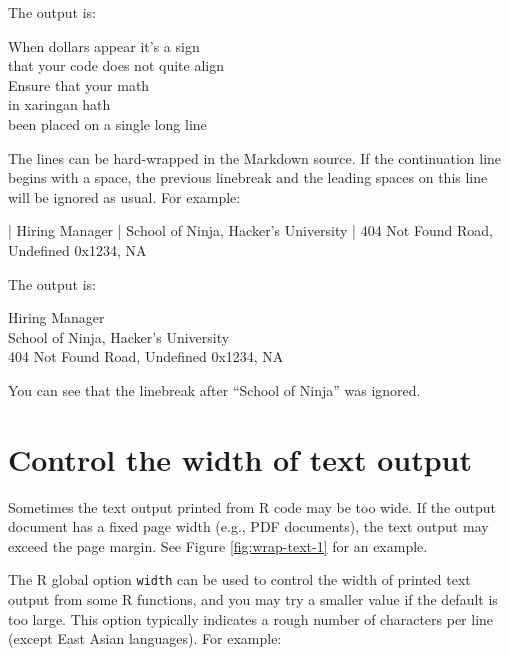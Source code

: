 \documentclass[
  11pt,
]{krantz}
\newenvironment{Shaded}{\begin{snugshade}}{\end{snugshade}}
\newcommand{\NormalTok}[1]{#1}
\renewenvironment{quote}{\begin{VF}}{\end{VF}}
\begin{document}
The output is:

\begin{quote}
When dollars appear it's a sign\\
\hspace*{0.333em}\hspace*{0.333em}that your code does not quite align\\
Ensure that your math\\
\hspace*{0.333em}\hspace*{0.333em}in xaringan hath\\
\hspace*{0.333em}\hspace*{0.333em}been placed on a single long line
\end{quote}

The lines can be hard-wrapped in the Markdown source. If the continuation line begins with a space, the previous linebreak and the leading spaces on this line will be ignored as usual. For example:

\begin{Shaded}
\begin{Highlighting}[]
\NormalTok{| Hiring Manager}
\NormalTok{| School of Ninja,}
\NormalTok{  Hacker's University}
\NormalTok{| 404 Not Found Road,}
\NormalTok{  Undefined 0x1234, NA}
\end{Highlighting}
\end{Shaded}

The output is:

\begin{quote}
Hiring Manager\\
School of Ninja, Hacker's University\\
404 Not Found Road, Undefined 0x1234, NA
\end{quote}

You can see that the linebreak after ``School of Ninja'' was ignored.

\hypertarget{text-width}{%
\section{Control the width of text output}\label{text-width}}

Sometimes the text output printed from R code may be too wide. If the output document has a fixed page width (e.g., PDF documents), the text output may exceed the page margin. See Figure \ref{fig:wrap-text-1} for an example.

The R global option \texttt{width} can be used to control the width of printed text output from some R functions, and you may try a smaller value if the default is too large. This option typically indicates a rough number of characters per line (except East Asian languages). For example:
\end{document}
